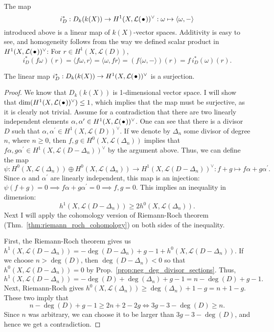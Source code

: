 The map
\[
  i_{D}^{\ast}:D_{k}(k(X))\to H^1(X,\mathcal{L}(\kern.08em\bullet\kern.08em))^{\vee}:\omega\mapsto \langle\omega, -\rangle
\]
introduced above is a linear map of $k(X)$-vector spaces. Additivity is
easy to see, and homogeneity follows from the way we defined scalar product
in $H^1(X,\mathcal{L}(\kern.08em\bullet\kern.08em))^{\vee}$: For $r\in H^{1}(X,\mathcal{L}(D))$,
\[
  i_{D}^{\ast}(f\omega)(r)=\langle f\omega, r\rangle = \langle\omega, fr\rangle
  =\left(f\langle\omega,-\rangle\right)(r)=f\,i_{D}^{\ast}(\omega)(r).
\]
\begin{lemm}
  The linear map $i_{D}^{\ast}:D_{k}(k(X))\to H^1(X,\mathcal{L}(\kern.08em\bullet\kern.08em))^{\vee}$ is a surjection.
\end{lemm}
\begin{proof}
  We know that $D_{k}(k(X))$ is 1-dimensional vector space. I will show
  that $\dim(H^1(X,\mathcal{L}(\kern.08em\bullet\kern.08em))^{\vee})\leq1$, which implies that the map must be surjective,
  as it is clearly not trivial. Assume for a contradiction that there are two
  linearly independent elements $\alpha, \alpha^{\prime}\in H^1(X,\mathcal{L}(\kern.08em\bullet\kern.08em))^{\vee}$. One can
  see that there is a divisor $D$ such that $\alpha, \alpha^{\prime}
  \in H^{1}(X,\mathcal{L}(D))^{\vee}$. If we denote by $\Delta_{n}$ some
  divisor of degree $n$, where $n\geq 0$, then $f,g
  \in H^{0}(X,\mathcal{L}(\Delta_{n}))$ implies that $f\alpha,g\alpha^{\prime}
  \in H^{1}(X,\mathcal{L}(D-\Delta_{n}))^{\vee}$ by the argument above.
  Thus, we can define the map
  \[
    \psi: H^{0}(X,\mathcal{L}(\Delta_{n}))\oplus
    H^{0}(X,\mathcal{L}(\Delta_{n}))\to
    H^{1}(X,\mathcal{L}(D-\Delta_{n}))^{\vee}:f+g\mapsto
    f\alpha+g\alpha^{\prime}.
  \]
  Since $\alpha$ and $\alpha^{\prime}$ are linearly independent, this
  map is an injection: $\psi(f+g)=0\implies f\alpha+g\alpha^{\prime}=0
  \implies f,g=0$. This implies an inequality in dimension:
  \[h^{1}(X,\mathcal{L}(D-\Delta_{n}))\geq 2h^{0}(X,\mathcal{L}(\Delta_{n})).\]
  Next I will apply the cohomology version of Riemann-Roch theorem
  (Thm.~\ref{thm:riemann_roch_cohomology}) on both sides of the inequality.

  First, the Riemann-Roch theorem gives us
  $h^{1}(X,\mathcal{L}(D-\Delta_{n}))=-\deg(D-\Delta_{n})+g-1
  +h^{0}(X,\mathcal{L}(D-\Delta_{n}))$. If we choose $n>\deg(D)$, then
  $\deg(D-\Delta_{n})<0$ so that $h^{0}(X,\mathcal{L}(D-\Delta_{n}))=0$
  by Prop.~\ref{prop:neg_deg_divisor_sections}. Thus,
  \[
    h^{1}(X,\mathcal{L}(D-\Delta_{n}))=-\deg(D)+\deg(\Delta_{n})+g-1=n-\deg(D)
    +g-1.
  \]
  Next, Riemann-Roch gives $h^{0}(X,\mathcal{L}(\Delta_{n}))\geq
  \deg(\Delta_{n})+1-g=n+1-g$.
  These two imply that
  \[
    n-\deg(D)+g-1\geq 2n+2-2g\iff 3g-3-\deg(D)\geq n.
  \]
  Since $n$ was arbitrary, we can choose it to be larger than $3g-3-\deg(D)$,
  and hence we get a contradiction.
\end{proof}

